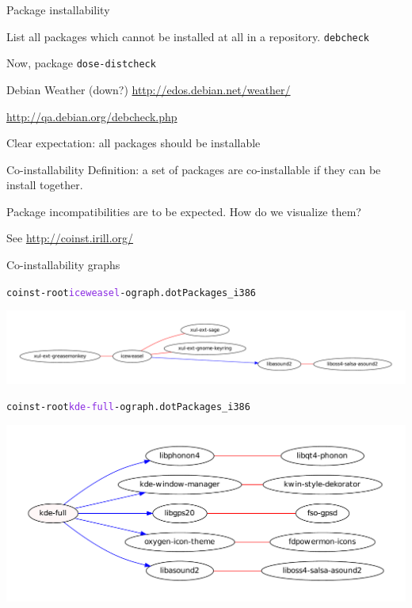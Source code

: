 \documentclass[xcolor={dvipsnames}]{beamer}
\newcommand{\EEE}[1]{\textcolor{BlueViolet}{#1}}
\begin{document}
\begin{frame}{Package installability}

List all packages which cannot be installed at all in a repository.
\texttt{debcheck}

Now, package \texttt{dose-distcheck}

Debian Weather (down?)
\url{http://edos.debian.net/weather/}

\url{http://qa.debian.org/debcheck.php}

Clear expectation: all packages should be installable

\end{frame}

\begin{frame}[fragile]{Co-installability}
Definition: a set of packages are co-installable if they can be install
together.

Package incompatibilities  are to be expected.
%
How do we visualize them?

See \url{http://coinst.irill.org/}
\end{frame}

\begin{frame}[fragile]{Co-installability graphs}
\begin{alltt}
coinst -root \EEE{iceweasel} -o graph.dot Packages_i386
\end{alltt}
\vspace{-2.5em}
\begin{center}
\includegraphics[width=\linewidth]{figures/iceweasel.pdf}
\end{center}
\vspace{-2em}
\begin{alltt}
coinst -root \EEE{kde-full} -o graph.dot Packages_i386
\end{alltt}
\vspace{-2.5em}
\begin{center}
\includegraphics[width=0.65\linewidth]{figures/kde-full.pdf}
\end{center}
\end{frame}
\end{document}
